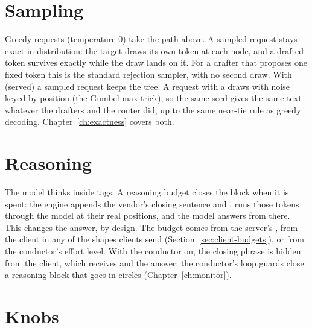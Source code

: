 \section{Sampling}

Greedy requests (temperature 0) take the path above. A sampled request stays exact in distribution: the target draws its own token at each node, and a drafted token survives exactly while the draw lands on it. For a drafter that proposes one fixed token this is the standard rejection sampler, with no second draw. With  (served) a sampled request keeps the tree. A request with a  draws with noise keyed by position (the Gumbel-max trick), so the same seed gives the same text whatever the drafters and the router did, up to the same near-tie rule as greedy decoding. Chapter~\ref{ch:exactness} covers both.

\section{Reasoning}

The model thinks inside  tags. A reasoning budget closes the block when it is spent: the engine appends the vendor's closing sentence and , runs those tokens through the model at their real positions, and the model answers from there. This changes the answer, by design. The budget comes from the server's , from the client in any of the shapes clients send (Section~\ref{sec:client-budgets}), or from the conductor's effort level. With the conductor on, the closing phrase is hidden from the client, which receives  and the answer; the conductor's loop guards close a reasoning block that goes in circles (Chapter~\ref{ch:monitor}).

\section{Knobs}

